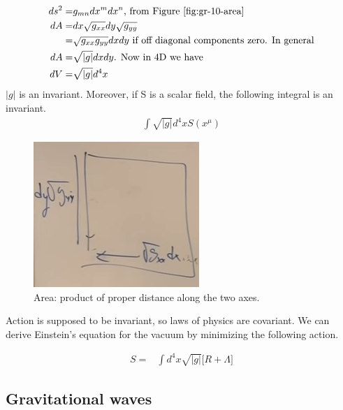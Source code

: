 \documentclass[]{article}
\begin{document}
{\begin{align*}
	ds^2 =& g_{mn} dx^m dx^n \text{, from Figure \ref{fig:gr-10-area}}\\
	dA =& dx\sqrt{g_{xx}} dy \sqrt{g_{yy}}\\
	=& \sqrt{g_{xx} g_{yy}} dx dy \text{ if off diagonal components zero. In general}\\
	dA =& \sqrt{\lvert g \rvert} dx dy	\text{. Now in 4D we have}\\
	dV =& \sqrt{\lvert g \rvert} d^4x
\end{align*}
$\lvert g \rvert$ is an invariant. Moreover, if S is a scalar field, the following integral is an invariant.
\begin{align*}
	\int \sqrt{\lvert g \rvert} d^4x S(x^\mu)
\end{align*}

\begin{figure}[H]
	\begin{center}
		\caption{Area: product of proper distance along the two axes.}\label{fig:gr-10-area}
		\includegraphics{gr-10-area}
	\end{center}
\end{figure}

Action is supposed to be invariant, so laws of physics are covariant. We can derive Einstein's equation for the vacuum by minimizing the following action.

\begin{align*}
	S=&\int d^4x \sqrt{\lvert g \rvert} \big[R + \Lambda\big]
\end{align*}

\begin{appendices}
	\section{Gravitational waves}


\end{appendices}}
\end{document}
